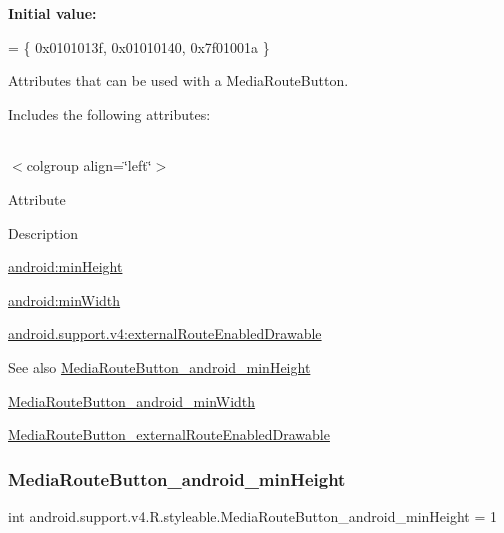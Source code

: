 {\bfseries Initial value\+:}
\begin{DoxyCode}
= \{
            0x0101013f, 0x01010140, 0x7f01001a
        \}
\end{DoxyCode}
Attributes that can be used with a Media\+Route\+Button. 

Includes the following attributes\+:

\tabulinesep=1mm
\begin{longtabu} spread 0pt [c]{*{0}{|X[-1]}|}
\hline
\end{longtabu}
$<$colgroup align=\char`\"{}left\char`\"{}$>$ 

Attribute

Description 

{\ttfamily \hyperlink{classandroid_1_1support_1_1v4_1_1R_1_1styleable_a91b1329e34bb685c52de237248568539}{android\+:min\+Height}}

{\ttfamily \hyperlink{classandroid_1_1support_1_1v4_1_1R_1_1styleable_ae31db3f058509971e536ad13a3e1790f}{android\+:min\+Width}}

{\ttfamily \hyperlink{classandroid_1_1support_1_1v4_1_1R_1_1styleable_ac728c56a3c75dec0ada942aaeb369128}{android.\+support.\+v4\+:external\+Route\+Enabled\+Drawable}}

\begin{DoxySeeAlso}{See also}
\hyperlink{classandroid_1_1support_1_1v4_1_1R_1_1styleable_a91b1329e34bb685c52de237248568539}{Media\+Route\+Button\+\_\+android\+\_\+min\+Height} 

\hyperlink{classandroid_1_1support_1_1v4_1_1R_1_1styleable_ae31db3f058509971e536ad13a3e1790f}{Media\+Route\+Button\+\_\+android\+\_\+min\+Width} 

\hyperlink{classandroid_1_1support_1_1v4_1_1R_1_1styleable_ac728c56a3c75dec0ada942aaeb369128}{Media\+Route\+Button\+\_\+external\+Route\+Enabled\+Drawable} 
\end{DoxySeeAlso}
\mbox{\label{classandroid_1_1support_1_1v4_1_1R_1_1styleable_a91b1329e34bb685c52de237248568539}} 
\subsubsection{\texorpdfstring{Media\+Route\+Button\+\_\+android\+\_\+min\+Height}{MediaRouteButton\_android\_minHeight}}
{\footnotesize\ttfamily int android.\+support.\+v4.\+R.\+styleable.\+Media\+Route\+Button\+\_\+android\+\_\+min\+Height = 1\hspace{0.3cm}{\ttfamily [static]}}

